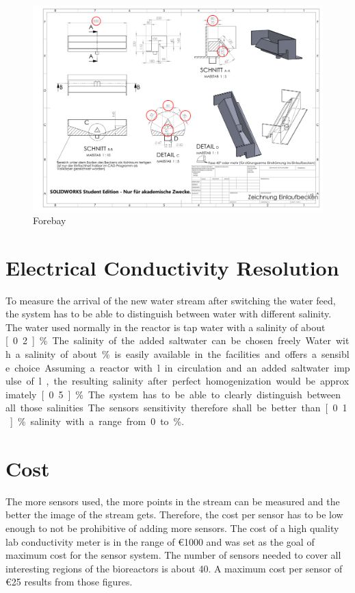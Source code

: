\begin{figure}
	\begin{center}
		\includegraphics[width=\textwidth]{images/Einlaufbecken.pdf} 
		\caption{Forebay}
		\label{fig:elb}
	\end{center}
\end{figure}

\section{Electrical Conductivity Resolution}

To measure the arrival of the new water stream after switching the water feed, the system has to be able to distinguish between water with different salinity. The water used normally in the reactor is tap water with a salinity of about \unit[0.2]{\%}. The salinity of the added saltwater can be chosen freely. Water with a salinity of about \unit[5]{\%} is easily available in the facilities and offers a sensible choice. Assuming a reactor with \unit[65]{l} in circulation and an added saltwater impulse of \unit[5]{l}, the resulting salinity after perfect homogenization would be approximately \unit[0.5]{\%}. The system has to be able to clearly distinguish between all those salinities. The sensors sensitivity therefore shall be better than \unit[0.1]{\%} salinity with a range from 0 to \unit[5]{\%}.

\section{Cost}

The more sensors used, the more points in the stream can be measured and the better the image of the stream gets. Therefore, the cost per sensor has to be low enough to not be prohibitive of adding more sensors.
The cost of a high quality lab conductivity meter is in the range of \euro{1000} and was set as the goal of maximum cost for the sensor system. The number of sensors needed to cover all interesting regions of the bioreactors is about 40.
A maximum cost per sensor of \euro{25} results from those figures.

